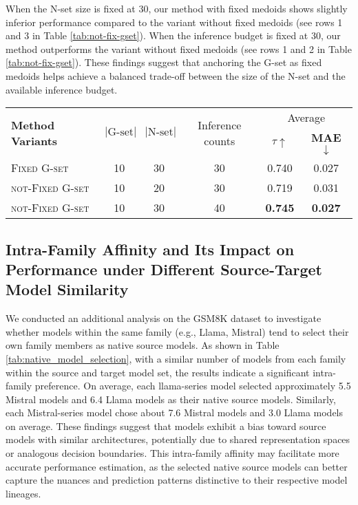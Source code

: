 When the N-set size is fixed at 30, our method with fixed medoids shows slightly inferior performance compared to the variant without fixed medoids (see rows 1 and 3 in Table \ref{tab:not-fix-gset}). When the inference budget is fixed at 30, our method outperforms the variant without fixed medoids (see rows 1 and 2 in Table \ref{tab:not-fix-gset}). These findings suggest that anchoring the G-set as fixed medoids helps achieve a balanced trade-off between the size of the N-set and the available inference budget.

\begin{table*}[ht]
\renewcommand\arraystretch{1}
\centering
\begin{tabular}{lccccc}
\toprule
\multirow{2}{*}{\textbf{Method Variants}} & \multirow{2}{*}{$|\text{G-set}|$} & \multirow{2}{*}{$|\text{N-set}|$} & \multirow{2}{*}{Inference counts} & \multicolumn{2}{c}{Average} \\
&  &  &  & \textbf{$\tau \uparrow$} & {\scriptsize \textbf{MAE} $\downarrow$} \\
\midrule
\textsc{Fixed G-set}           & 10  & 30  & 30  &  0.740  & 0.027 \\
\textsc{not-Fixed G-set}      & 10  & 20  & 30  &  0.719  & 0.031 \\
\textsc{not-Fixed G-set}       & 10  & 30  & 40  &  \textbf{0.745} & \textbf{0.027} \\
\bottomrule
\end{tabular}
\caption{Performance Comparison of N-set Construction Methods with and without Fixed G-set Medoids.}
\label{tab:not-fix-gset}
\end{table*}


\subsection{Intra-Family Affinity and Its Impact on Performance under Different Source-Target Model Similarity}
\label{apd:intra-family-models}
We conducted an additional analysis on the GSM8K dataset to investigate whether models within the same family (e.g., Llama, Mistral) tend to select their own family members as native source models. As shown in Table \ref{tab:native_model_selection}, with a similar number of models from each family within the source and target model set, the results indicate a significant intra-family preference. On average, each llama-series model selected approximately 5.5 Mistral models and 6.4 Llama models as their native source models. Similarly, each Mistral-series model chose about 7.6 Mistral models and 3.0 Llama models on average. These findings suggest that models exhibit a bias toward source models with similar architectures, potentially due to shared representation spaces or analogous decision boundaries. This intra-family affinity may facilitate more accurate performance estimation, as the selected native source models can better capture the nuances and prediction patterns distinctive to their respective model lineages.


